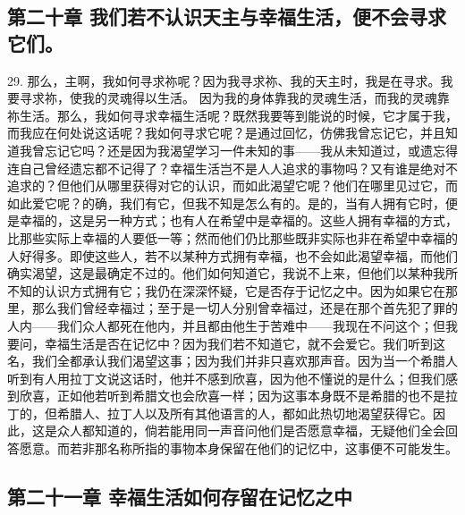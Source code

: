 
\subsection{第二十章 我们若不认识天主与幸福生活，便不会寻求它们。}

29. 那么，主啊，我如何寻求祢呢？因为我寻求祢、我的天主时，我是在寻求。我要寻求祢，使我的灵魂得以生活。 因为我的身体靠我的灵魂生活，而我的灵魂靠祢生活。那么，我如何寻求幸福生活呢？既然我要等到能说的时候，它才属于我，而我应在何处说这话呢？我如何寻求它呢？是通过回忆，仿佛我曾忘记它，并且知道我曾忘记它吗？还是因为我渴望学习一件未知的事——我从未知道过，或遗忘得连自己曾经遗忘都不记得了？幸福生活岂不是人人追求的事物吗？又有谁是绝对不追求的？但他们从哪里获得对它的认识，而如此渴望它呢？他们在哪里见过它，而如此爱它呢？的确，我们有它，但我不知是怎么有的。是的，当有人拥有它时，便是幸福的，这是另一种方式；也有人在希望中是幸福的。这些人拥有幸福的方式，比那些实际上幸福的人要低一等；然而他们仍比那些既非实际也非在希望中幸福的人好得多。即使这些人，若不以某种方式拥有幸福，也不会如此渴望幸福，而他们确实渴望，这是最确定不过的。他们如何知道它，我说不上来，但他们以某种我所不知的认识方式拥有它；我仍在深深怀疑，它是否存于记忆之中。因为如果它在那里，那么我们曾经幸福过；至于是一切人分别曾幸福过，还是在那个首先犯了罪的人内——我们众人都死在他内，并且都由他生于苦难中——我现在不问这个；但我要问，幸福生活是否在记忆中？因为我们若不知道它，就不会爱它。我们听到这名，我们全都承认我们渴望这事；因为我们并非只喜欢那声音。因为当一个希腊人听到有人用拉丁文说这话时，他并不感到欣喜，因为他不懂说的是什么；但我们感到欣喜，正如他若听到希腊文也会欣喜一样；因为这事本身既不是希腊的也不是拉丁的，但希腊人、拉丁人以及所有其他语言的人，都如此热切地渴望获得它。因此，这是众人都知道的，倘若能用同一声音问他们是否愿意幸福，无疑他们全会回答愿意。而若非那名称所指的事物本身保留在他们的记忆中，这事便不可能发生。\par


\subsection{第二十一章 幸福生活如何存留在记忆之中}

